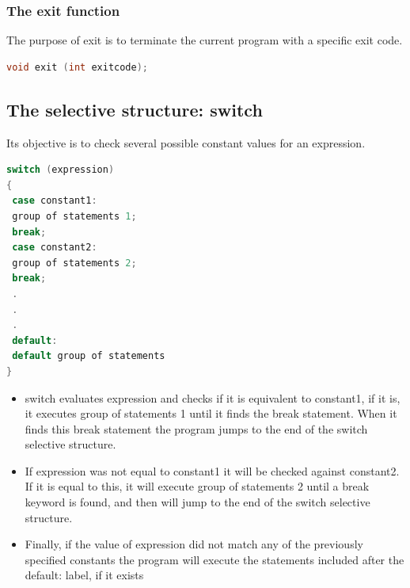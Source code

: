 \documentclass[12pt,oneside]{book}
\begin{document}
\subsubsection{The exit function}
The purpose of exit is to terminate the current program with a specific exit code.
	\begin{lstlisting}[language=C++]
    void exit (int exitcode);
\end{lstlisting}
\subsection{The selective structure: switch}
Its objective is to check several possible constant values for an expression.
	\begin{lstlisting}[language=C++]
switch (expression) 
{ 
 case constant1: 
 group of statements 1; 
 break; 
 case constant2: 
 group of statements 2; 
 break; 
 . 
 . 
 . 
 default: 
 default group of statements 
} 
\end{lstlisting}
\begin{itemize}
	\item switch evaluates expression and checks if it is equivalent to constant1, if it is, it
	      executes group of statements 1 until it finds the break statement. When it finds this break statement the
	      program jumps to the end of the switch selective structure.
	\item If expression was not equal to constant1 it will be checked against constant2. If it is equal to this, it will execute
	      group of statements 2 until a break keyword is found, and then will jump to the end of the switch selective
	      structure.
	\item Finally, if the value of expression did not match any of the previously specified constants the program will execute the statements included after the default: label, if it exists
\end{itemize}
\end{document}
